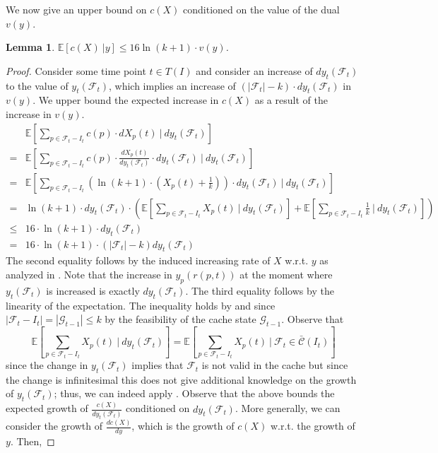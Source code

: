 \documentclass[11pt]{article}
\newcommand{\cG}{{\mathcal{G}}}
\newcommand{\cF}{{\mathcal{F}}}
\newcommand{\cC}{{\mathcal{C}}}
\newcommand{\E}{{\mathbb{E}}}
\newcommand{\bbc}{{\bar{\cC}(I_t)}}
\newtheorem{lemma}[thm]{Lemma}
\begin{document}
{We now give an upper bound on $c(X)$ conditioned on the value of the dual $v(y)$.  

	\begin{lemma}
	\label{lem:c(X)}
	$\E \left[ c(X) ~\big| y \right] \leq 16 \ln (k+1) \cdot v(y)$. 
\end{lemma}

\begin{proof}
	Consider some time point $t \in T(I)$ and consider an increase of $d y_t(\cF_t)$ to the value of $y_t(\cF_t)$, which implies an increase of $(|\cF_t|-k) \cdot d y_t(\cF_t)$ in $v(y)$. We upper bound the expected increase in $c(X)$ as a result of the increase in $v(y)$. 
	\begin{equation}
		\label{eq:IncX}
		\begin{aligned}
	{} &	\E \left[ \sum_{p \in \cF_t-I_t} c(p) \cdot d X_p(t)~\bigg|~d y_t(\cF_t) \right] \\
		={} & 	\E \left[ \sum_{p \in \cF_t-I_t} c(p) \cdot \frac{d X_p(t)}{d y_t(\cF_t)} \cdot d y_t(\cF_t) ~\bigg|~d y_t(\cF_t) \right] \\
		={} &  \E \left[ \sum_{p \in \cF_t-I_t} \left( \ln (k+1) \cdot \left( X_p(t)+\frac{1}{k}\right)\right) \cdot d y_t(\cF_t) ~\bigg|~d y_t(\cF_t)\right]\\
		={} &  \ln (k+1) \cdot d y_t(\cF_t) \cdot \left( \E \left[ \sum_{p \in \cF_t-I_t} X_p(t)  ~\bigg|~d y_t(\cF_t) \right] + \E \left[\sum_{p \in \cF_t-I_t} \frac{1}{k} ~\bigg|~d y_t(\cF_t) \right]\right)\\
		\leq {} &   16 \cdot \ln (k+1) \cdot d y_t(\cF_t) \\
		= {} &  16 \cdot \ln (k+1) \cdot \left( |\cF_t|-k \right)d y_t(\cF_t)
		\end{aligned}
	\end{equation} The second equality follows by the induced increasing rate of $X$ w.r.t. $y$ as analyzed in \cite{bansal2012randomized}. Note that the increase in $y_p(r(p,t))$ at the moment where $y_t(\cF_t)$ is increased is exactly $d y_t(\cF_t)$. The third equality follows by the linearity of the expectation. The inequality holds by  and since $|\cF_t-I_t| = |\cG_{t-1}| \leq k$ by the feasibility of the cache state $\cG_{t-1}$. Observe that $$\E \left[ \sum_{p \in \cF_t-I_t} X_p(t)  ~\bigg|~d y_t(\cF_t) \right] = \E \left[ \sum_{p \in \cF_t-I_t} X_p(t)  ~\bigg|~\cF_t \in \bbc \right]$$ since the change in $y_t(\cF_t)$ implies that $\cF_t$ is not valid in the cache but since the change is infinitesimal this does not give additional knowledge on the growth of $y_t(\cF_t)$; thus, we can indeed apply . Observe that the above bounds the expected growth of $ \frac{c(X)}{d y_t(\cF_t)}$ conditioned on $d y_t(\cF_t)$. More generally, we can consider the growth of $ \frac{d c(X)}{d y}$, which is the growth of $c(X)$ w.r.t. the growth of $y$. Then, 
	

\end{proof}}
\end{document}
